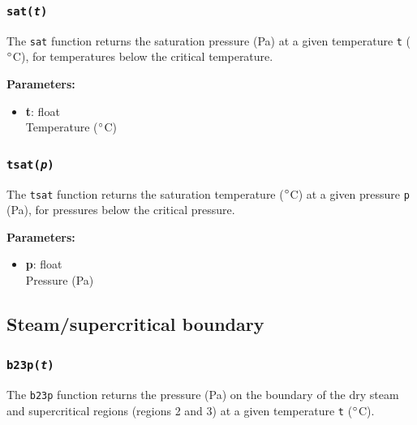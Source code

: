 \begin{snugshade}
\subsubsection{\texttt{sat(\emph{t})}}
\end{snugshade}
\label{sec:iapws97:sat}

The \texttt{sat} function returns the saturation pressure (Pa) at a given temperature \texttt{t} ($\degree$C), for temperatures below the critical temperature.

\textbf{Parameters:}
\begin{itemize}
\item \textbf{t}: float\\
  Temperature ($\degree$C)
\end{itemize}

\begin{snugshade}
\subsubsection{\texttt{tsat(\emph{p})}}
\end{snugshade}
\label{sec:iapws97:tsat}

The \texttt{tsat} function returns the saturation temperature ($\degree$C) at a given pressure \texttt{p} (Pa), for pressures below the critical pressure.

\textbf{Parameters:}
\begin{itemize}
\item \textbf{p}: float\\
  Pressure (Pa)
\end{itemize}

\subsection{Steam/supercritical boundary}
\label{region23_boundary}

\begin{snugshade}
\subsubsection{\texttt{b23p(\emph{t})}}
\end{snugshade}
\label{sec:iapws97:b23p}

The \texttt{b23p} function returns the pressure (Pa) on the boundary of the dry steam and supercritical regions (regions 2 and 3) at a given temperature \texttt{t} ($\degree$C).

